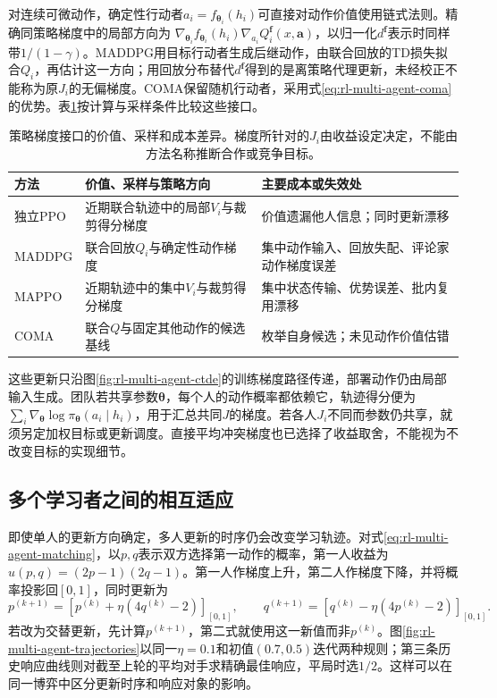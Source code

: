 对连续可微动作，确定性行动者$a_i=f_{\bm\theta_i}(h_i)$可直接对动作价值使用链式法则。精确同策略梯度中的局部方向为
$\nabla_{\bm\theta_i}f_{\bm\theta_i}(h_i)\nabla_{a_i}Q_i^{\bm f}(x,\bm a)$，以归一化$d^{\bm f}$表示时同样带$1/(1-\gamma)$。MADDPG用目标行动者生成后继动作，由联合回放的TD损失拟合$Q_i$，再估计这一方向；用回放分布替代$d^{\bm f}$得到的是离策略代理更新，未经校正不能称为原$J_i$的无偏梯度。COMA保留随机行动者，采用式\eqref{eq:rl-multi-agent-coma}的优势。表\ref{tab:rl-multi-agent-policy-updates}按计算与采样条件比较这些接口。

\begin{table}[htbp]
 \centering
 \begin{tabularx}{\linewidth}{@{}l >{\raggedright\arraybackslash}X >{\raggedright\arraybackslash}X@{}}
 \toprule
 方法 & 价值、采样与策略方向 & 主要成本或失效处\\
 \midrule
 独立PPO & 近期联合轨迹中的局部$V_i$与裁剪得分梯度 & 价值遗漏他人信息；同时更新漂移\\
 MADDPG & 联合回放$Q_i$与确定性动作梯度 & 集中动作输入、回放失配、评论家动作梯度误差\\
 MAPPO & 近期轨迹中的集中$V_i$与裁剪得分梯度 & 集中状态传输、优势误差、批内复用漂移\\
 COMA & 联合$Q$与固定其他动作的候选基线 & 枚举自身候选；未见动作价值估错\\
 \bottomrule
 \end{tabularx}
 \caption{策略梯度接口的价值、采样和成本差异。梯度所针对的$J_i$由收益设定决定，不能由方法名称推断合作或竞争目标。}
 \label{tab:rl-multi-agent-policy-updates}
\end{table}

这些更新只沿图\ref{fig:rl-multi-agent-ctde}的训练梯度路径传递，部署动作仍由局部输入生成。团队若共享参数$\bm\theta$，每个人的动作概率都依赖它，轨迹得分便为$\sum_i\nabla_{\bm\theta}\log\pi_{\bm\theta}(a_i\mid h_i)$，用于汇总共同$J$的梯度。若各人$J_i$不同而参数仍共享，就须另定加权目标或更新调度。直接平均冲突梯度也已选择了收益取舍，不能视为不改变目标的实现细节。

\subsection{多个学习者之间的相互适应}
\label{sec:rl-multi-agent-mutual-learning}

即使单人的更新方向确定，多人更新的时序仍会改变学习轨迹。对式\eqref{eq:rl-multi-agent-matching}，以$p,q$表示双方选择第一动作的概率，第一人收益为$u(p,q)=(2p-1)(2q-1)$。第一人作梯度上升，第二人作梯度下降，并将概率投影回$[0,1]$，同时更新为
\[
 p^{(k+1)}=[p^{(k)}+\eta(4q^{(k)}-2)]_{[0,1]},\qquad
 q^{(k+1)}=[q^{(k)}-\eta(4p^{(k)}-2)]_{[0,1]}.
\]
若改为交替更新，先计算$p^{(k+1)}$，第二式就使用这一新值而非$p^{(k)}$。图\ref{fig:rl-multi-agent-trajectories}以同一$\eta=0.1$和初值$(0.7,0.5)$迭代两种规则；第三条历史响应曲线则对截至上轮的平均对手求精确最佳响应，平局时选$1/2$。这样可以在同一博弈中区分更新时序和响应对象的影响。

